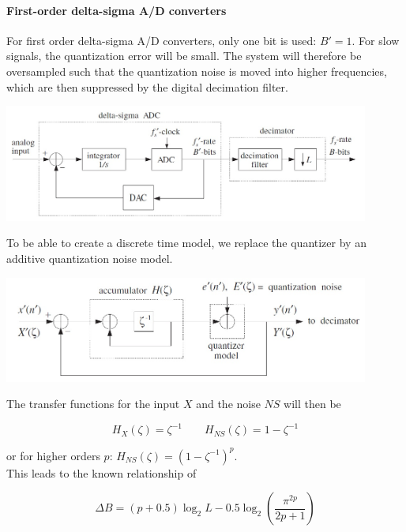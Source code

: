 \paragraph{First-order delta-sigma A/D converters}
For first order delta-sigma A/D converters, only one bit is used: $B'=1$. For
slow signals, the quantization error will be small. The system will therefore
be oversampled such that the quantization noise is moved into higher frequencies,
which are then suppressed by the digital decimation filter.

\begin{center}
	\includegraphics[width=12cm]{images/IntDecOv_SigmaDelta.jpg}
\end{center}

To be able to create a discrete time model, we replace the quantizer by
an additive quantization noise model.

\begin{center}
	\includegraphics[width=12cm]{images/IntDecOv_SigmaDeltaModel.jpg}
\end{center}

The transfer functions for the input $X$ and the noise $NS$ will then be

\begin{equation*}
	H_X(\zeta) = \zeta^{-1} \qquad H_{NS}(\zeta) = 1 - \zeta^{-1}
\end{equation*}

or for higher orders $p$: $H_{NS}(\zeta) = (1-\zeta^{-1})^p$. \\

This leads to the known relationship of

\begin{equation*}
	\Delta B = (p+0.5) \log_2 L - 0.5 \log_2\left(\frac{\pi^{2p}}{2p+1}\right)
\end{equation*}


